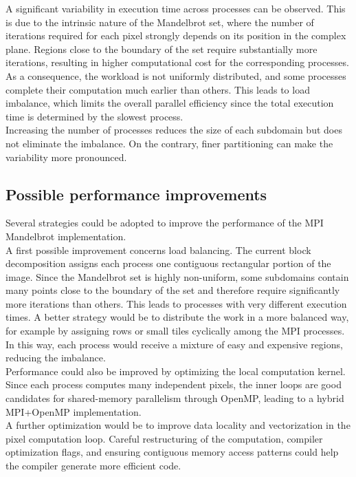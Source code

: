 \documentclass[unicode,10pt,a4paper,oneside,numbers=endperiod,openany]{scrartcl}
\begin{document}
A significant variability in execution time across processes can be observed. This is due to the intrinsic nature of the Mandelbrot set, where the number of iterations required for each pixel strongly depends on its position in the complex plane. Regions close to the boundary of the set require substantially more iterations, resulting in higher computational cost for the corresponding processes.\\

As a consequence, the workload is not uniformly distributed, and some processes complete their computation much earlier than others. This leads to load imbalance, which limits the overall parallel efficiency since the total execution time is determined by the slowest process.\\

Increasing the number of processes reduces the size of each subdomain but does not eliminate the imbalance. On the contrary, finer partitioning can make the variability more pronounced.\\

\subsection{Possible performance improvements}
Several strategies could be adopted to improve the performance of the MPI Mandelbrot implementation.\\

A first possible improvement concerns load balancing. The current block decomposition assigns each process one contiguous rectangular portion of the image. Since the Mandelbrot set is highly non-uniform, some subdomains contain many points close to the boundary of the set and therefore require significantly more iterations than others. This leads to processes with very different execution times. A better strategy would be to distribute the work in a more balanced way, for example by assigning rows or small tiles cyclically among the MPI processes. In this way, each process would receive a mixture of easy and expensive regions, reducing the imbalance.\\

Performance could also be improved by optimizing the local computation kernel. Since each process computes many independent pixels, the inner loops are good candidates for shared-memory parallelism through OpenMP, leading to a hybrid MPI+OpenMP implementation.\\

A further optimization would be to improve data locality and vectorization in the pixel computation loop. Careful restructuring of the computation, compiler optimization flags, and ensuring contiguous memory access patterns could help the compiler generate more efficient code.
\newpage
\end{document}
